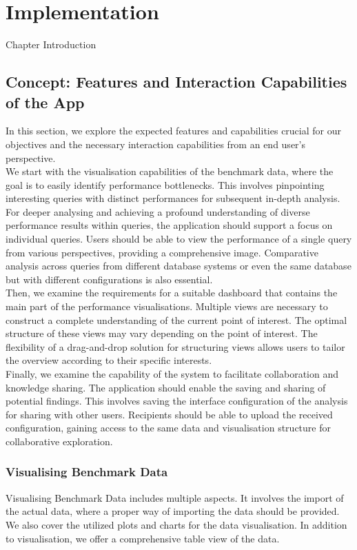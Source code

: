 
\chapter{Implementation}\label{chapter:implementation}
Chapter Introduction


\section{Concept: Features and Interaction Capabilities of the App}
In this section, we explore the expected features and capabilities crucial for our objectives and the necessary interaction capabilities from an end user's perspective.\\
We start with the visualisation capabilities of the benchmark data, where the goal is to easily identify performance bottlenecks. This involves pinpointing interesting queries with distinct performances for subsequent in-depth analysis.\\
For deeper analysing and achieving a profound understanding of diverse performance results within queries, the application should support a focus on individual queries. Users should be able to view the performance of a single query from various perspectives, providing a comprehensive image. Comparative analysis across queries from different database systems or even the same database but with different configurations is also essential.\\ 
Then, we examine the requirements for a suitable dashboard that contains the main part of the performance visualisations. Multiple views are necessary to construct a complete understanding of the current point of interest. The optimal structure of these views may vary depending on the point of interest. The flexibility of a drag-and-drop solution for structuring views allows users to tailor the overview according to their specific interests.\\
Finally, we examine the capability of the system to facilitate collaboration and knowledge sharing. The application should enable the saving and sharing of potential findings. This involves saving the interface configuration of the analysis for sharing with other users. Recipients should be able to upload the received configuration, gaining access to the same data and visualisation structure for collaborative exploration.


\subsection{Visualising Benchmark Data}
Visualising Benchmark Data includes multiple aspects. It involves the import of the actual data, where a proper way of importing the data should be provided. We also cover the utilized plots and charts for the data visualisation. In addition to visualisation, we offer a comprehensive table view of the data.


